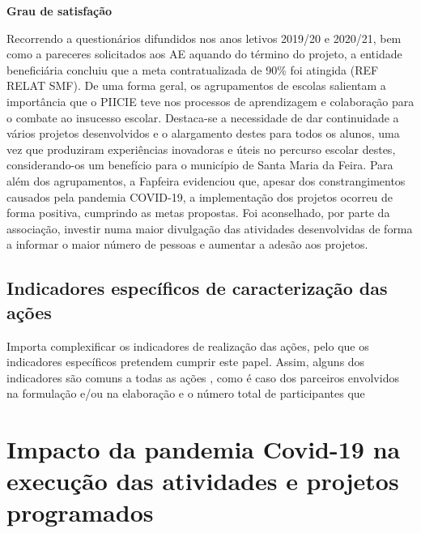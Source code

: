 \documentclass[
]{book}
\begin{document}
\textbf{Grau de satisfação}

Recorrendo a questionários difundidos nos anos letivos 2019/20 e 2020/21, bem como a pareceres solicitados aos AE aquando do término do projeto, a entidade beneficiária concluiu que a meta contratualizada de 90\% foi atingida (REF RELAT SMF). De uma forma geral, os agrupamentos de escolas salientam a importância que o PIICIE teve nos processos de aprendizagem e colaboração para o combate ao insucesso escolar. Destaca-se a necessidade de dar continuidade a vários projetos desenvolvidos e o alargamento destes para todos os alunos, uma vez que produziram experiências inovadoras e úteis no percurso escolar destes, considerando-os um benefício para o município de Santa Maria da Feira. Para além dos agrupamentos, a Fapfeira evidenciou que, apesar dos constrangimentos causados pela pandemia COVID-19, a implementação dos projetos ocorreu de forma positiva, cumprindo as metas propostas. Foi aconselhado, por parte da associação, investir numa maior divulgação das atividades desenvolvidas de forma a informar o maior número de pessoas e aumentar a adesão aos projetos.

\hypertarget{indicadores-especuxedficos-de-caracterizauxe7uxe3o-das-auxe7uxf5es}{%
\section{Indicadores específicos de caracterização das ações}\label{indicadores-especuxedficos-de-caracterizauxe7uxe3o-das-auxe7uxf5es}}

Importa complexificar os indicadores de realização das ações, pelo que os indicadores específicos pretendem cumprir este papel. Assim, alguns dos indicadores são comuns a todas as ações , como é caso dos parceiros envolvidos na formulação e/ou na elaboração e o número total de participantes que

\hypertarget{impacto-da-pandemia-covid-19-na-execuuxe7uxe3o-das-atividades-e-projetos-programados}{%
\chapter{\texorpdfstring{\textbf{Impacto da pandemia Covid-19 na execução das atividades e projetos programados}}{Impacto da pandemia Covid-19 na execução das atividades e projetos programados}}\label{impacto-da-pandemia-covid-19-na-execuuxe7uxe3o-das-atividades-e-projetos-programados}}
\end{document}
